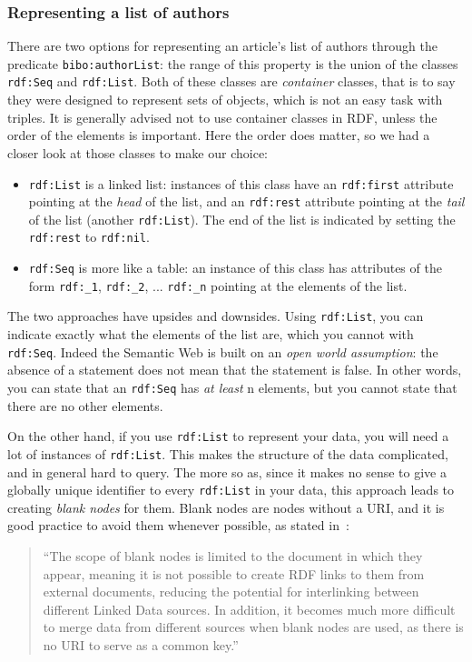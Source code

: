 \documentclass[a4paper,11pt]{report}
\begin{document}
\subsubsection*{Representing a list of authors}
There are two options for representing an article's list of authors through the predicate \texttt{bibo:authorList}: the range of this property is the union of the classes  \texttt{rdf:Seq} and  \texttt{rdf:List}. Both of these classes are \emph{container} classes, that is to say they were designed to represent sets of objects, which is not an easy task with triples. It is generally advised not to use container classes in RDF, unless the order of the elements is important. Here the order does matter, so we had a closer look at those classes to make our choice: 
\begin{itemize}
\item \texttt{rdf:List} is a linked list: instances of this class have an \texttt{rdf:first} attribute pointing at the \emph{head} of the list, and an \texttt{rdf:rest} attribute pointing at the \emph{tail} of the list (another \texttt{rdf:List}). The end of the list is indicated by setting the \texttt{rdf:rest} to \texttt{rdf:nil}. 
\item \texttt{rdf:Seq} is more like a table: an instance of this class has attributes of the form \texttt{rdf:{\_}1}, \texttt{rdf:{\_}2}, ... \texttt{rdf:{\_}n} pointing at the elements of the list. 
\end{itemize}

The two approaches have upsides and downsides. Using \texttt{rdf:List}, you can indicate exactly what the elements of the list are, which you cannot with \texttt{rdf:Seq}. Indeed the Semantic Web is built on an \emph{open world assumption}: the absence of a statement does not mean that the statement is false. In other words, you can state that an \texttt{rdf:Seq} has \emph{at least} n elements, but you cannot state that there are no other elements. 

On the other hand, if you use \texttt{rdf:List} to represent your data, you will need a lot of instances of \texttt{rdf:List}. This makes the structure of the data complicated, and in general hard to query. The more so as, since it makes no sense to give a globally unique identifier to every \texttt{rdf:List} in your data, this approach leads to creating \emph{blank nodes} for them. Blank nodes are nodes without a URI, and it is good practice to avoid them whenever possible, as stated in~\cite{Heath2011}:
\begin{quotation}
``The scope of blank nodes is limited to the document in which they appear, meaning it is not possible to create RDF links to them from external documents, reducing the potential for interlinking between different Linked Data sources. In addition, it becomes much more difficult to merge data from different sources when blank nodes are used, as there is no URI to serve as a common key.''
\end{quotation}
\end{document}

